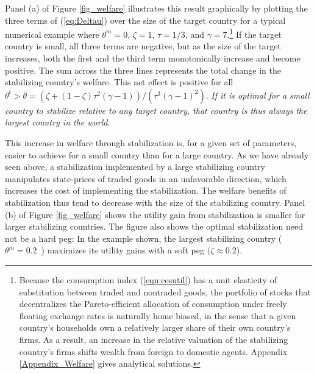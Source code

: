 \documentclass[12pt,letter]{article}
\theoremstyle{break} \theorembodyfont{\normalfont\itshape}
\theoremstyle{break}
\theoremstyle{break} \theorembodyfont{\normalfont\itshape}
\theoremstyle{break} \theorembodyfont{\normalfont\itshape}
\begin{document}
Panel (a) of Figure \ref{fig_welfare} illustrates this result
graphically by plotting the three terms of (\ref{eq:Deltau}) over the
size of the target country for a typical numerical example where
$\theta^m=0 $, \(\zeta=1\), \(\tau=1/3\), and
\(\gamma=7\).\footnote{Because the consumption index
  (\ref{eqn:cesutil}) has a unit elasticity of substitution between
  traded and nontraded goods, the portfolio of stocks that
  decentralizes the Pareto-efficient allocation of consumption under
  freely floating exchange rates is naturally home biased, in the
  sense that a given country's households own a relatively larger
  share of their own country's firms. As a result, an increase in the
  relative valuation of the stabilizing country's firms shifts wealth
  from foreign to domestic agents. Appendix \ref{Appendix_Welfare}
  gives analytical solutions. } If the target country is small, all
three terms are negative, but as the size of the target increases,
both the first and the third term monotonically increase and become
positive. The sum across the three lines represents the total change
in the stabilizing country's welfare. This net effect is positive for
all
$\theta^t>\bar{\theta}=(\zeta+(1-\zeta)\tau^2(\gamma-1))/(\tau^3(\gamma-1)^2).
$ \textit{If it is optimal for a small country to stabilize relative
  to any target country, that country is thus always the largest
  country in the world. }

This increase in welfare through stabilization is, for a given set of
parameters, easier to achieve for a small country than for a large
country. As we have already seen above, a stabilization implemented by
a large stabilizing country manipulates state-prices of traded goods
in an unfavorable direction, which increases the cost of implementing
the stabilization. The welfare benefits of stabilization thus tend to
decrease with the size of the stabilizing country. Panel (b) of Figure
\ref{fig_welfare} shows the utility gain from stabilization is smaller
for larger stabilizing countries. The figure also shows the optimal
stabilization need not be a hard peg: In the example shown, the
largest stabilizing country (\(\theta^m=0.2\)\ ) maximizes its utility
gains with a soft peg \((\zeta\approx0.2\)).
\end{document}
